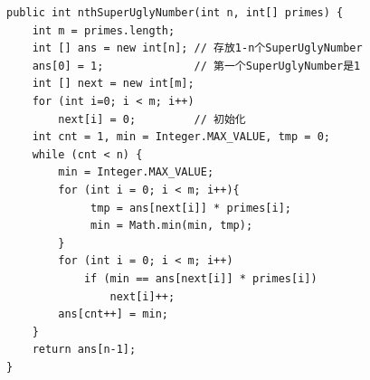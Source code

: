 \documentclass[9pt, b5paper]{article}
\begin{document}
\begin{verbatim}
public int nthSuperUglyNumber(int n, int[] primes) {
    int m = primes.length;
    int [] ans = new int[n]; // 存放1-n个SuperUglyNumber
    ans[0] = 1;              // 第一个SuperUglyNumber是1
    int [] next = new int[m];
    for (int i=0; i < m; i++)
        next[i] = 0;         // 初始化
    int cnt = 1, min = Integer.MAX_VALUE, tmp = 0;
    while (cnt < n) {
        min = Integer.MAX_VALUE;
        for (int i = 0; i < m; i++){
             tmp = ans[next[i]] * primes[i];
             min = Math.min(min, tmp);
        }
        for (int i = 0; i < m; i++)
            if (min == ans[next[i]] * primes[i])
                next[i]++;
        ans[cnt++] = min;			
    }
    return ans[n-1];		
}
\end{verbatim}
\end{document}

